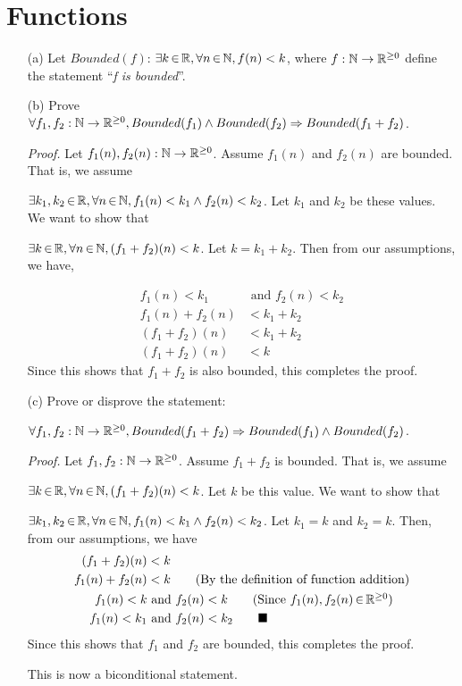 \documentclass[12pt]{article}
\newcommand{\qed}{\tag*{$\blacksquare$}}
\begin{document}
\section{Functions}
\begin{enumerate}
\item[(a)] Let $Bounded(f)$: $\exists k \,{\in}\, \mathbb R, \forall n \,{\in}\, \mathbb N, f(n) < k$, where $f: \mathbb N \rightarrow \mathbb R^{\ge 0}$ define the statement ``\emph{f is bounded}''.



\item[(b)] Prove $\forall f_1, f_2: \mathbb N \rightarrow \mathbb R^{\ge 0}, Bounded(f_1) \wedge Bounded(f_2) \Rightarrow Bounded(f_1 + f_2)$.

\emph{Proof.} Let $f_1(n), f_2(n): \mathbb N \rightarrow \mathbb R^{\ge 0}$. Assume $f_1(n)$ and $f_2(n)$ are bounded. That is, we assume

$\exists k_1, k_2 \,{\in}\, \mathbb R, \forall n \,{\in}\, \mathbb N, f_1(n) < k_1 \wedge f_2(n) < k_2$. Let $k_1$ and $k_2$ be these values. We want to show that

$\exists k \,{\in}\, \mathbb R, \forall n \,{\in}\, \mathbb N, (f_1 + f_2)(n) < k$. Let $k = k_1 + k_2$. Then from our assumptions, we have,

\begin{align*}
f_1(n) < k_1 &\text{ and } f_2(n) < k_2 \\
f_1(n) + f_2(n) &< k_1 + k_2 \tag{Adding the respective sides} \\
(f_1 + f_2)(n) &< k_1 + k_2 \tag{By the definition of function addition} \\
(f_1 + f_2)(n) &< k
\qed
\end{align*}
Since this shows that $f_1 + f_2$ is also bounded, this completes the proof.

\item[(c)] Prove or disprove the statement:

$\forall f_1, f_2: \mathbb N \rightarrow \mathbb R^{\ge 0}, Bounded(f_1 + f_2) \Rightarrow Bounded(f_1) \wedge Bounded(f_2)$.

\emph{Proof.} Let $f_1, f_2: \mathbb N \rightarrow \mathbb R^{\ge 0}$. Assume $f_1 + f_2$ is bounded. That is, we assume

$\exists k \,{\in}\, \mathbb R, \forall n \,{\in}\, \mathbb N, (f_1 + f_2)(n) < k$. Let $k$ be this value. We want to show that

$\exists k_1, k_2 \,{\in}\, \mathbb R, \forall n \,{\in}\, \mathbb N, f_1(n) < k_1 \wedge f_2(n) < k_2$. Let $k_1 = k$ and $k_2 = k$. Then, from our assumptions, we have
\begin{align*}
(f_1 + f_2)(n) &< k \\
f_1(n) + f_2(n) &< k \tag{By the definition of function addition} \\
f_1(n) < k &\text{ and } f_2(n) < k \tag{Since $f_1(n), f_2(n) \IN \R^{\ge 0}$} \\
f_1(n) < k_1 &\text{ and } f_2(n) < k_2
\qed
\end{align*}
Since this shows that $f_1$ and $f_2$ are bounded, this completes the proof.

This is now a biconditional statement.

\end{enumerate}
\end{document}

